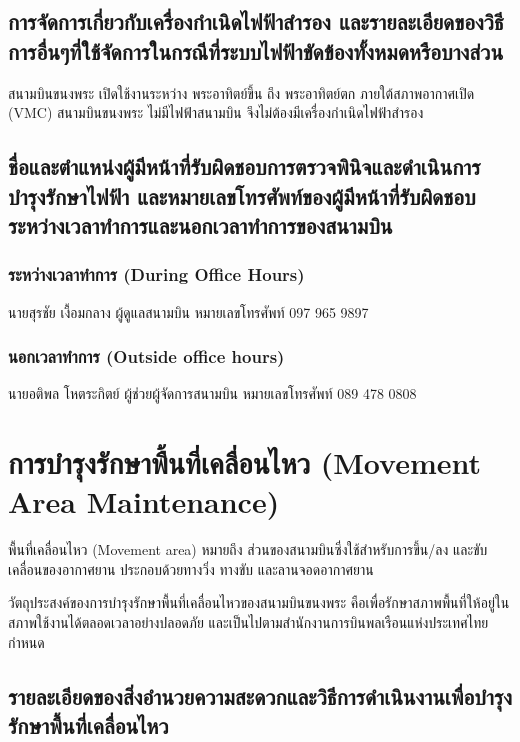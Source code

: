 \subsection{การจัดการเกี่ยวกับเครื่องกำเนิดไฟฟ้าสำรอง และรายละเอียดของวิธีการอื่นๆที่ใช้จัดการในกรณีที่ระบบไฟฟ้าขัดข้องทั้งหมดหรือบางส่วน}

สนามบินขนงพระ เปิดใช้งานระหว่าง พระอาทิตย์ขึ้น ถึง พระอาทิตย์ตก ภายใต้สภาพอากาศเปิด (VMC) สนามบินขนงพระ ไม่มีไฟฟ้าสนามบิน จึงไม่ต้องมีเครื่องกำเนิดไฟฟ้าสำรอง

\subsection{ชื่อและตำแหน่งผู้มีหน้าที่รับผิดชอบการตรวจพินิจและดำเนินการบำรุงรักษาไฟฟ้า และหมายเลขโทรศัพท์ของผู้มีหน้าที่รับผิดชอบระหว่างเวลาทำการและนอกเวลาทำการของสนามบิน}

\subsubsection{ระหว่างเวลาทำการ (During Office Hours)}

นายสุรชัย เงื้อมกลาง ผู้ดูแลสนามบิน  หมายเลขโทรศัพท์ 097 965 9897

\subsubsection{นอกเวลาทำการ (Outside office hours)}

นายอติพล โหตระกิตย์ ผู้ช่วยผู้จัดการสนามบิน	หมายเลขโทรศัพท์ 089 478 0808

\section{การบำรุงรักษาพื้นที่เคลื่อนไหว (Movement Area Maintenance)}

พื้นที่เคลื่อนไหว (Movement area) หมายถึง ส่วนของสนามบินซึ่งใช้สำหรับการขึ้น/ลง และขับเคลื่อนของอากาศยาน ประกอบด้วยทางวิ่ง ทางขับ และลานจอดอากาศยาน

วัตถุประสงค์ของการบำรุงรักษาพื้นที่เคลื่อนไหวของสนามบินขนงพระ คือเพื่อรักษาสภาพพื้นที่ให้อยู่ในสภาพใช้งานได้ตลอดเวลาอย่างปลอดภัย และเป็นไปตามสำนักงานการบินพลเรือนแห่งประเทศไทยกำหนด

\subsection{รายละเอียดของสิ่งอำนวยความสะดวกและวิธีการดำเนินงานเพื่อบำรุงรักษาพื้นที่เคลื่อนไหว}

